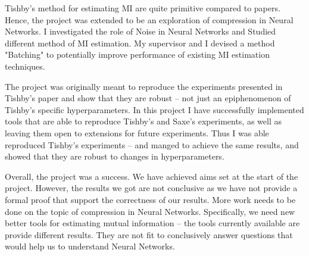 \documentclass[dissertation.tex]{subfiles}
\begin{document}
Tishby's method for estimating MI are quite primitive compared to
papers\cite{WGAO}\cite{SGAO}. Hence, the project was extended to be an
exploration of compression in Neural Networks. I investigated the role of Noise
in Neural Networks and Studied different method of MI estimation. My supervisor
and I devised a method "Batching" to potentially improve performance of existing
MI estimation techniques.

The project was originally meant to reproduce the experiments presented in
Tishby's paper and show that they are robust -- not just an epiphenomenon of
Tishby's specific hyperparameters.  In this project I have successfully
implemented tools that are able to reproduce Tishby's and Saxe's experiments, as
well as leaving them open to extensions for future experiments.  Thus I was able
reproduced Tishby's experiments -- and manged to achieve the same results, and
showed that they are robust to changes in hyperparameters. 

Overall, the project was a success. We have achieved aims set at the start of
the project. However, the results we got are not conclusive as we have not
provide a formal proof that support the correctness of our results. More work
needs to be done on the topic of compression in Neural Networks. Specifically,
we need new better tools for estimating mutual information -- the tools
currently available are provide different results. They are not fit to
conclusively answer questions that would help us to understand Neural Networks. 
\end{document}
